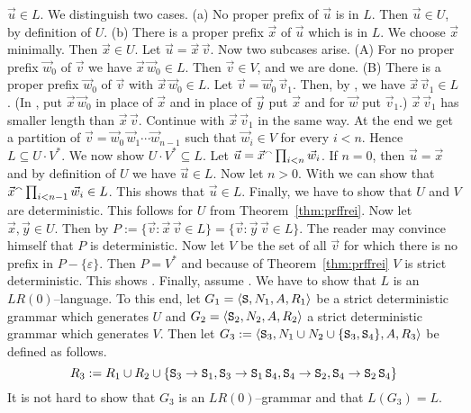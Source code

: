 $\vec{u} \in L$. We distinguish two cases.
(a) No proper prefix of $\vec{u}$ is in $L$.
Then $\vec{u} \in U$, by definition of $U$.
(b) There is a proper prefix $\vec{x}$ of $\vec{u}$
which is in $L$. We choose $\vec{x}$ minimally.
Then $\vec{x} \in U$. Let $\vec{u} = \vec{x} \, \vec{v}$.
Now two subcases arise. (A) For no proper prefix
$\vec{w}_0$ of $\vec{v}$ we have $\vec{x}\, \vec{w}_0
\in L$. Then $\vec{v} \in V$, and we are done.
(B) There is a proper prefix $\vec{w}_0$ of $\vec{v}$
with $\vec{x}\, \vec{w}_0 \in L$. Let $\vec{v} =
\vec{w}_0 \, \vec{v}_1$. Then, by ,
we have $\vec{x} \, \vec{v}_1 \in L$. (In , put
$\vec{x}\, \vec{w}_0$ in place of $\vec{x}$ and in place of
$\vec{y}$ put $\vec{x}$ and for $\vec{w}$ put $\vec{v}_1$.)
$\vec{x}\, \vec{v}_1$ has smaller length than $\vec{x}\, \vec{v}$.
Continue with $\vec{x} \, \vec{v}_1$ in the same way.
At the end we get a partition of $\vec{v} =
\vec{w}_0 \, \vec{w}_1 \dotsb \vec{w}_{n-1}$ such that
$\vec{w}_i \in V$ for every $i < n$. Hence $L \subseteq
U \cdot V^{\ast}$. We now show $U \cdot V^{\ast} \subseteq L$.
Let $\vec{u} = \vec{x} {^{\smallfrown}} \prod_{i < n} \vec{w}_i$.
If $n = 0$, then $\vec{u} = \vec{x}$ and by definition
of $U$ we have $\vec{u} \in L$. Now let $n > 0$. With
 we can show that $\vec{x} {^{\smallfrown}} \prod_{i < n-1}
\vec{w}_i \in L$. This shows that $\vec{u} \in L$.
Finally, we have to show that $U$ and $V$ are deterministic.
This follows for $U$ from Theorem~\ref{thm:prffrei}. Now let
$\vec{x}, \vec{y} \in U$. Then by  
$P := \{\vec{v} : \vec{x}\, \vec{v} \in L\} =
\{\vec{v} : \vec{y}\, \vec{v} \in L\}$. The reader may convince
himself that $P$ is deterministic. Now let $V$ be the set of
all $\vec{v}$ for which there is no prefix in $P - \{\varepsilon\}$.
Then $P = V^{\ast}$ and because of Theorem~\ref{thm:prffrei}
$V$ is strict deterministic. This shows .
Finally, assume . We have to show that
$L$ is an $LR(0)$--language. To this end, let
$G_1 = \langle \mbox{\tt S}, N_1, A, R_1\rangle$ be a strict
deterministic grammar which generates $U$ and
$G_2 = \langle \mbox{\tt S}_2, N_2, A, R_2\rangle$
a strict deterministic grammar which generates $V$.
Then let $G_3 := \langle \mbox{\tt S}_3, N_1 \cup N_2 \cup
\{\mbox{\tt S}_3, \mbox{\tt S}_4\}, A, R_3\rangle$ be defined
as follows.
\begin{equation}
R_3 := R_1 \cup R_2 \cup \{\mbox{\tt S}_3 \rightarrow \mbox{\tt S}_1,
\mbox{\tt S}_3 \rightarrow \mbox{\tt S}_1 \, \mbox{\tt S}_4,
\mbox{\tt S}_4 \rightarrow \mbox{\tt S}_2, \mbox{\tt S}_4 \rightarrow
\mbox{\tt S}_2 \, \mbox{\tt S}_4\}  
\end{equation}
It is not hard to show that $G_3$ is an $LR(0)$--grammar
and that $L(G_3) = L$.
\proofend

